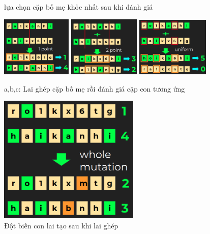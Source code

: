 \documentclass[14pt]{article}
\begin{document}
\begin{center}
\begin{figure}[htbp]
			\caption{lựa chọn cặp bố mẹ khỏe nhất sau khi đánh giá}
			\label{fig:mylabel}
		\end{figure}
		\begin{figure}[htbp]
			\centering
			\includegraphics[width=0.3\textwidth]{./Image/step4.png}
			\includegraphics[width=0.305\textwidth]{./Image/step5.png}
			\includegraphics[width=0.31\textwidth]{./Image/step6.png}
			\caption{a,b,c: Lai ghép cặp bố mẹ rồi đánh giá cặp con tương ứng}
			\label{fig:mylabel}
		\end{figure}
		\begin{figure}[htbp]
			\centering
			\includegraphics[width=0.6\textwidth]{./Image/step7.png}
			\caption{Đột biến con lai tạo sau khi lai ghép}
			\label{fig:mylabel}
		\end{figure}
	\end{center}
	\newpage
\end{document}
